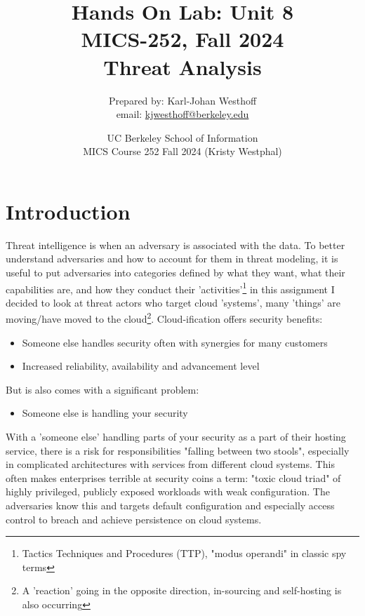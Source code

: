 \documentclass[
	letterpaper, %
	10pt, %
	unnumberedsections, %
	twoside, %
]{APAAssignment}
\title{Hands On Lab: Unit 8 \\ MICS-252, Fall 2024 \\ Threat Analysis} %
\date{UC Berkeley School of Information \\
MICS Course 252 Fall 2024 (Kristy Westphal)
}
\author{
	Prepared by: Karl-Johan Westhoff \\
	email: \href{mailto:kjwesthoff@berkeley.edu}{kjwesthoff@berkeley.edu}
}
\begin{document}
\onecolumn
\maketitle %



\section{Introduction}
Threat intelligence is when an adversary is associated with the data. To better understand adversaries and how to account for them in threat modeling, it is useful to put adversaries into categories defined by what they want, what their capabilities are, and how they conduct their 'activities'\footnote{Tactics Techniques and Procedures (TTP), "modus operandi" in classic spy terms} in this assignment I decided to look at threat actors who target cloud 'systems', many 'things' are moving/have moved to the cloud\footnote{A 'reaction' going in the opposite direction, in-sourcing and self-hosting is also occurring\cite{DHH_leftTheCloud}}. Cloud-ification offers security benefits:

\begin{itemize}
	\item Someone else handles security often with synergies for many customers
	\item Increased reliability, availability and advancement level
\end{itemize}

But is also comes with a significant problem:
\begin{itemize}
	\item Someone else is handling your security
\end{itemize}

With a 'someone else' handling parts of your security as a part of their hosting service, there is a risk for responsibilities "falling between two stools", especially in complicated architectures with services from different cloud systems. This often makes enterprises terrible at security \cite{CloudComputingInsider} coins a term: "toxic cloud triad" of highly privileged, publicly exposed workloads with weak configuration. The adversaries know this and targets default configuration and especially access control to breach and achieve persistence on cloud systems.
\end{document}

